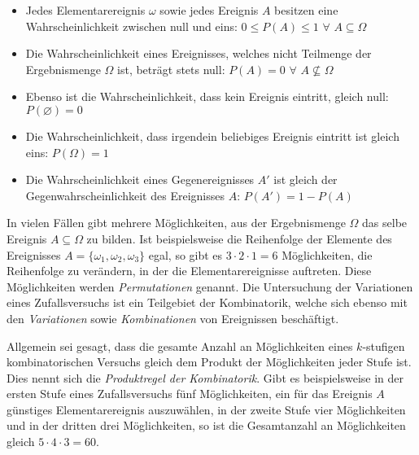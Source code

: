 \begin{itemize}
	\item Jedes Elementarereignis $\omega$ sowie jedes Ereignis $A$ besitzen eine Wahrscheinlichkeit zwischen null und eins: $0 \leq P(A) \leq 1 \,\,\forall\,\, A \subseteq \Omega$

	\item Die Wahrscheinlichkeit eines Ereignisses, welches nicht Teilmenge der Ergebnismenge $\Omega$ ist, betr\"{a}gt stets null: $P(A) = 0 \,\,\forall\,\, A \nsubseteq \Omega$

	\item Ebenso ist die Wahrscheinlichkeit, dass kein Ereignis eintritt, gleich null: $P(\varnothing) = 0$

	\item Die Wahrscheinlichkeit, dass irgendein beliebiges Ereignis eintritt ist gleich eins: $P(\Omega) = 1$

	\item Die Wahrscheinlichkeit eines Gegenereignisses $A'$ ist gleich der Gegenwahrscheinlichkeit des Ereignisses $A$: $P(A') = 1 - P(A)$
\end{itemize}


In vielen F\"{a}llen gibt mehrere M\"{o}glichkeiten, aus der Ergebnismenge $\Omega$ das selbe Ereignis $A \subseteq \Omega$ zu bilden. Ist beispielsweise die Reihenfolge der Elemente des Ereignisses $A = \{\omega_1, \omega_2, \omega_3\}$ egal, so gibt es $3 \cdot 2 \cdot 1 = 6$ M\"{o}glichkeiten, die Reihenfolge zu ver\"{a}ndern, in der die Elementarereignisse auftreten. Diese M\"{o}glichkeiten werden \emph{Permutationen} genannt. Die Untersuchung der Variationen eines Zufallsversuchs ist ein Teilgebiet der Kombinatorik, welche sich ebenso mit den \emph{Variationen} sowie \emph{Kombinationen} von Ereignissen besch\"{a}ftigt.

Allgemein sei gesagt, dass die gesamte Anzahl an M\"{o}glichkeiten eines $k$-stufigen kombinatorischen Versuchs gleich dem Produkt der M\"{o}glichkeiten jeder Stufe ist. Dies nennt sich die \emph{Produktregel der Kombinatorik}. Gibt es beispielsweise in der ersten Stufe eines Zufallsversuchs f\"{u}nf M\"{o}glichkeiten, ein f\"{u}r das Ereignis $A$ g\"{u}nstiges Elementarereignis auszuw\"{a}hlen, in der zweite Stufe vier M\"{o}glichkeiten und in der dritten drei M\"{o}glichkeiten, so ist die Gesamtanzahl an M\"{o}glichkeiten gleich $5 \cdot 4 \cdot 3 = 60$.


